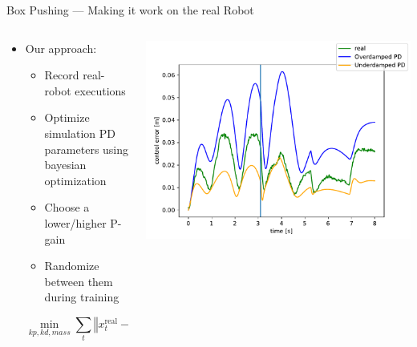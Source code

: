 \documentclass[16:9,en,navbarinfooter]{sdqbeamer}
\begin{document}
\begin{frame}{Box Pushing --- Making it work on the real Robot}
\begin{columns}
    \begin{column}{0.5\textwidth}
        \begin{itemize}
                \item Our approach:
                    \begin{itemize}
                            \item Record real-robot executions
                            \item Optimize simulation PD parameters using bayesian optimization
                            \item Choose a lower/higher P-gain
                            \item Randomize between them during training
                    \end{itemize}

                    \[
                        \min_{kp, kd, mass} \sum_t \left\Vert x_t^\text{real} - x_t^\text{sim}(kp, kd, mass) \right\Vert
                    \]
        \end{itemize}
    \end{column}

    \begin{column}{0.5\textwidth}
\includegraphics[width=\linewidth]{media/ctrl_error.pdf}\\
    \end{column}
\end{columns}

\end{frame}
\end{document}
